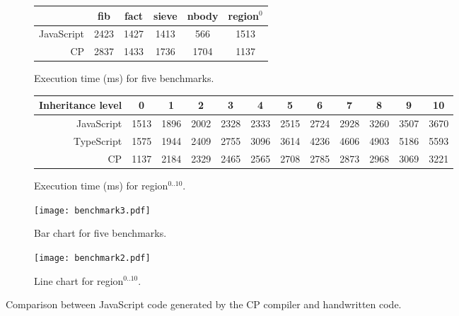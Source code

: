 \begin{figure}
\begin{subfigure}{\textwidth}
\centering
\footnotesize
\begin{tabular}{r*{5}{c}}
& \sffamily fib & \sffamily fact & \sffamily sieve & \sffamily nbody & \sffamily region$^0$ \\
\toprule
\sffamily JavaScript & 2423 & 1427 & 1413 &  566 & 1513 \\
\sffamily CP         & 2837 & 1433 & 1736 & 1704 & 1137 \\
\bottomrule
\end{tabular}
\caption{Execution time (ms) for five benchmarks.} \label{tab:benchmark3}
\end{subfigure}
\begin{subfigure}{\textwidth}
\centering
\footnotesize
\bigskip
\begin{tabular}{r*{11}{c}}
Inheritance level & 0 & 1 & 2 & 3 & 4 & 5 & 6 & 7 & 8 & 9 & 10 \\
\toprule
\sffamily JavaScript & 1513 & 1896 & 2002 & 2328 & 2333 & 2515 & 2724 & 2928 & 3260 & 3507 & 3670 \\
\sffamily TypeScript & 1575 & 1944 & 2409 & 2755 & 3096 & 3614 & 4236 & 4606 & 4903 & 5186 & 5593 \\
\sffamily CP         & 1137 & 2184 & 2329 & 2465 & 2565 & 2708 & 2785 & 2873 & 2968 & 3069 & 3221 \\
\bottomrule
\end{tabular}
\caption{Execution time (ms) for \textsf{region}$^{0..10}$.} \label{tab:benchmark2}
\end{subfigure}
\begin{subfigure}{.5\textwidth}
\centering
\texttt{[image: benchmark3.pdf]}
\caption{Bar chart for five benchmarks.}  \label{fig:benchmark3}
\end{subfigure}%
\begin{subfigure}{.5\textwidth}
\centering
\texttt{[image: benchmark2.pdf]}
\caption{Line chart for \textsf{region}$^{0..10}$.}  \label{fig:benchmark2}
\end{subfigure}
\caption{Comparison between JavaScript code generated by the CP compiler and handwritten code.}
\end{figure}

